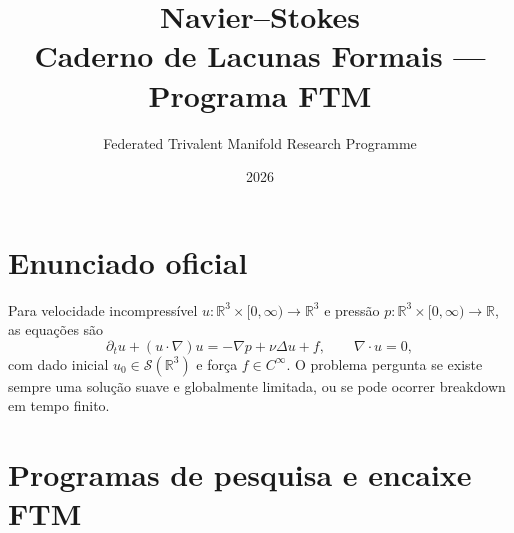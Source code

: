 \documentclass[11pt,a4paper]{article}
\title{Navier–Stokes\\[4pt]
       \large Caderno de Lacunas Formais — Programa FTM}
\author{Federated Trivalent Manifold Research Programme}
\date{2026}
\begin{document}
\maketitle
\tableofcontents
\bigskip

\section{Enunciado oficial}

\begin{definition}
Para velocidade incompressível $u:\mathbb R^3\times[0,\infty)\to\mathbb R^3$
e pressão $p:\mathbb R^3\times[0,\infty)\to\mathbb R$, as equações são
\[
  \partial_t u+(u\cdot\nabla)u = -\nabla p+\nu\Delta u+f,
  \qquad \nabla\cdot u=0,
\]
com dado inicial $u_0\in\mathcal S(\mathbb R^3)$ e força $f\in C^\infty$.
O problema pergunta se existe sempre uma solução suave e globalmente
limitada, ou se pode ocorrer breakdown em tempo finito.
\end{definition}

\bigskip

\section{Programas de pesquisa e encaixe FTM}
\end{document}
